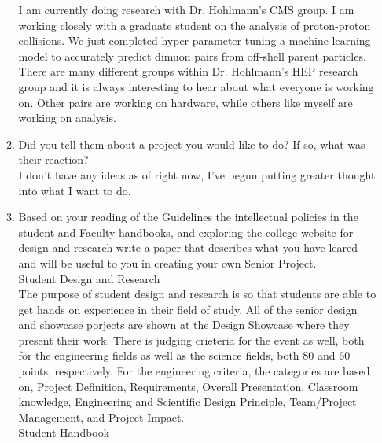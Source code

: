\documentclass{article}
\begin{document}
\begin{itemize}
\begin{enumerate}
                  I am currently doing research with Dr. Hohlmann's CMS group. I am working closely with a graduate student on the analysis of
                  proton-proton collisions. We just completed hyper-parameter tuning a machine learning model to accurately predict dimuon pairs
                  from off-shell parent particles. There are many different groups within Dr. Hohlmann's HEP research group and it is always interesting
                  to hear about what everyone is working on. Other pairs are working on hardware, while others like myself are working on analysis. \\


            \item Did you tell them about a project you would like to do? If so, what was their reaction? \\

                  I don't have any ideas as of right now, I've begun putting greater thought into what I want to do. \\

            \item Based on your reading of the Guidelines the intellectual policies in the student and Faculty
                  handbooks, and exploring the college website for design and research write a paper that describes
                  what you have leared and will be useful to you in creating your own Senior Project. \\

                  Student Design and Research \\

                  The purpose of student design and research is so that students are able to get hands on experience in their field of 
                  study. All of the senior design and showcase porjects are shown at the Design Showcase where they present their work. 
                  There is judging crieteria for the event as well, both for the engineering fields as well as the science fields, both 
                  80 and 60 points, respectively. For the engineering criteria, the categories are based on, Project Definition, Requirements, 
                  Overall Presentation, Classroom knowledge, Engineering and Scientific Design Principle, Team/Project Management, and Project 
                  Impact. \\

                  Student Handbook \\


\end{enumerate}
\end{itemize}
\end{document}
